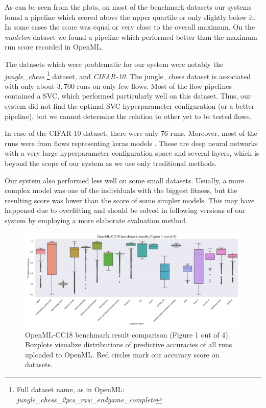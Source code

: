 As can be seen from the plots, on most of the benchmark datasets our systems
found a pipeline which scored above the upper quartile or only slightly below
it. In some cases the score was equal or very close to the overall maximum. On
the \emph{madelon} dataset we found a pipeline which performed better than the
maximum run score recorded in OpenML.

The datasets which were problematic for our system were notably the
\emph{jungle\_chess} \footnote{Full dataset name, as in OpenML:
\emph{jungle\_chess\_2pcs\_raw\_endgame\_complete}} dataset, 
and \emph{CIFAR-10}. The jungle\_chess dataset is associated with only
about $3,700$ runs on only few flows. Most of the flow pipelines contained a
SVC, which performed particularly well on this dataset. Thus, our system did
not find the optimal SVC hyperparameter configuration (or a better pipeline),
but we cannot determine the relation to other yet to be tested flows.

In case of the CIFAR-10 dataset, there were only 76 runs. Moreover, most of the
runs were from flows representing keras models \citep{chollet2015keras}. These
are deep neural networks with a very large hyperparameter configuration space
and several layers, which is beyond the scope of our system as we use only
traditional methods.

Our system also performed less well on some small datasets. Usually, a more
complex model was one of the individuals with the biggest fitness, but the
resulting score was lower than the score of some simpler models. This may have
happened due to overfitting and should be solved in following versions of our
system by employing a more elaborate evaluation method.


\begin{figure}
    \includegraphics[width=\textwidth]{../img/openml-boxplot0.png}
    \caption[OpenML-CC18 benchmark result compad rison (Figure 1 out of 4)]{
    OpenML-CC18 benchmark result comparison (Figure 1 out of 4).
    Boxplots visualize distributions of predictive accuracies of all
    runs uploaded to OpenML. Red circles mark our accuracy score on datasets.}
    \label{fig:OpenML:boxplot:0}
\end{figure}

